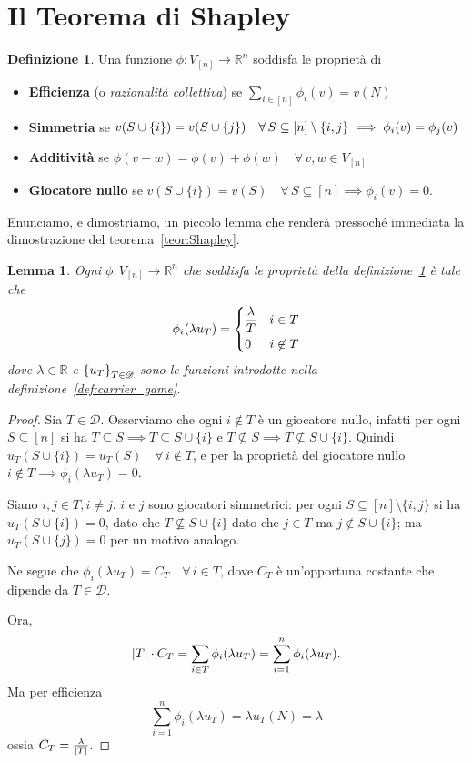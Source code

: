 \documentclass[a4paper,11pt]{article}
\theoremstyle{definition}				%
\newtheorem{definizione}{Definizione}%
\theoremstyle{remark}
\theoremstyle{plain}
\newtheorem{lemma}{Lemma}%
\newcommand{\R}{\mathbb{R}}										%
\begin{document}
	
	\section*{Il Teorema di Shapley}
	\begin{definizione}\label{def:proprietà}
		Una funzione $\phi\colon V_{[n]}\to\R^n$ soddisfa le proprietà di
		\begin{itemize}
			\item \textbf{Efficienza} (o \emph{razionalità collettiva}) se $\sum_{i\in[n]}\phi_i(v)=v(N)$
			\item \textbf{Simmetria} se $v(S\cup\{i\})=v(S\cup\left\{j\right\})\quad\forall\,S\subseteq[n]\setminus\qty{i,j}\implies\phi_i(v)=\phi_j(v)$
			\item \textbf{Additività} se $\phi(v+w)=\phi(v)+\phi(w)\quad\forall\,v,w\in V_{[n]}$
			\item \textbf{Giocatore nullo} se $v(S\cup\{i\})=v(S)\quad\forall\,S\subseteq[n]\implies\phi_i(v)=0$.
		\end{itemize}
	\end{definizione}
    Enunciamo, e dimostriamo, un piccolo lemma che renderà pressoché immediata la dimostrazione del teorema~\ref{teor:Shapley}.
    \begin{lemma}\label{lemma:common_structure}
        Ogni $\phi\colon V_{[n]}\to\R^n$ che soddisfa le proprietà della definizione~\ref{def:proprietà} è tale che 
        \[
            \phi_i(\lambda u_T)=\begin{dcases}
                \frac{\lambda}{T} & i\in T\\
                0 & i\not\in T
            \end{dcases}
        \]
        dove $\lambda\in\R$ e $\qty{u_T}_{T\in\mathscr{D}}$ sono le funzioni introdotte nella definizione~\ref{def:carrier_game}.
    \end{lemma}
    \begin{proof}
        Sia $T\in\mathscr{D}$. Osserviamo che ogni $i\notin T$ è un giocatore nullo, infatti per ogni $S\subseteq[n]$ si ha $T\subseteq S\implies T\subseteq S\cup\{i\}$ e $T\not\subseteq S\implies T\not\subseteq S\cup\{i\}$. Quindi $u_T(S\cup\{i\})=u_T(S)\quad\forall\,i\notin T$, e per la proprietà del giocatore nullo $i\notin T\implies\phi_i(\lambda u_T)=0$.

        Siano $i,j\in T, i\ne j$. $i$ e $j$ sono giocatori simmetrici: per ogni $S\subseteq[n]\setminus\{i,j\}$ si ha $u_T(S\cup\{i\})=0$, dato che $T\not\subseteq S\cup\{i\}$ dato che $j\in T$ ma $j\notin S\cup\{i\}$; ma $u_T(S\cup\{j\})=0$ per un motivo analogo. 
        
        Ne segue che $\phi_i(\lambda u_T)=C_T\quad\forall\,i\in T$, dove $C_T$ è un'opportuna costante che dipende da $T\in\mathscr{D}$.

        Ora,
        \[
            \qty|T|\cdot C_T = \sum_{i\in T}\phi_i(\lambda u_T)=\sum_{i=1}^n\phi_i(\lambda u_T).
        \]
        Ma per efficienza
        \[
             \sum_{i=1}^n\phi_i(\lambda u_T)=\lambda u_T(N)=\lambda
        \]
        ossia $C_T=\frac{\lambda}{\qty|T|}$.
    \end{proof}
    
\end{document}
